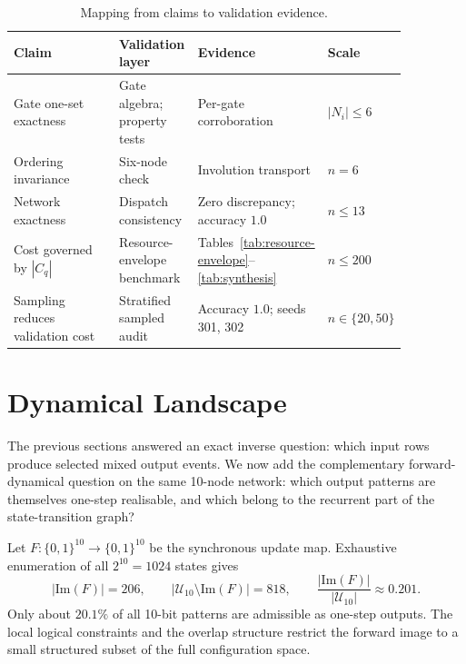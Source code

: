 \documentclass[11pt]{article}
\newcommand{\bits}{\{0,1\}}
\begin{document}
\begin{table}[h]
\centering
\small
\begin{tabular}{@{}p{0.28\linewidth}p{0.20\linewidth}p{0.28\linewidth}p{0.10\linewidth}@{}}
\toprule
\textbf{Claim} & \textbf{Validation layer} & \textbf{Evidence} & \textbf{Scale} \\
\midrule
Gate one-set exactness &
Gate algebra; property tests &
Per-gate corroboration &
$|N_i|\leq 6$ \\[3pt]
Ordering invariance &
Six-node check &
Involution transport &
$n=6$ \\[3pt]
Network exactness &
Dispatch consistency &
Zero discrepancy; accuracy $1.0$ &
$n\leq 13$ \\[3pt]
Cost governed by $|C_q|$ &
Resource-envelope benchmark &
Tables~\ref{tab:resource-envelope}--\ref{tab:synthesis} &
$n\leq 200$ \\[3pt]
Sampling reduces validation cost &
Stratified sampled audit &
Accuracy $1.0$; seeds 301, 302 &
$n\in\{20,50\}$ \\
\bottomrule
\end{tabular}
\caption{Mapping from claims to validation evidence.}
\label{tab:validation-map}
\end{table}


\section{Dynamical Landscape}\label{sec:dynamics}

The previous sections answered an exact inverse question: which input rows
produce selected mixed output events.  We now add the complementary
forward-dynamical question on the same 10-node network: which output
patterns are themselves one-step realisable, and which belong to the
recurrent part of the state-transition graph?

Let $F:\bits^{10}\to\bits^{10}$ be the synchronous update map.  Exhaustive
enumeration of all $2^{10}=1024$ states gives
\[
|\mathrm{Im}(F)| = 206,
\qquad
|\mathcal{U}_{10}\setminus\mathrm{Im}(F)| = 818,
\qquad
\frac{|\mathrm{Im}(F)|}{|\mathcal{U}_{10}|} \approx 0.201.
\]
Only about $20.1\%$ of all 10-bit patterns are admissible as one-step
outputs.  The local logical constraints and the overlap structure restrict
the forward image to a small structured subset of the full configuration
space.
\end{document}
